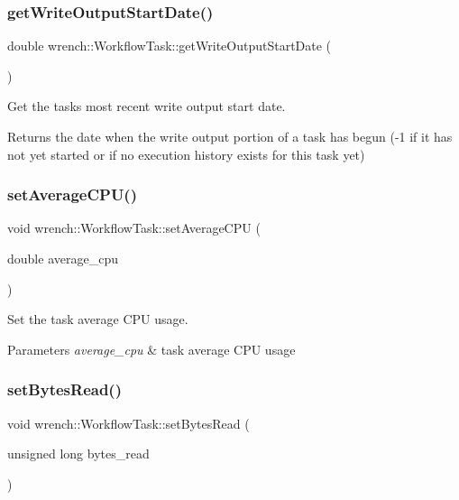 \subsubsection{\texorpdfstring{get\+Write\+Output\+Start\+Date()}{getWriteOutputStartDate()}}
{\footnotesize\ttfamily double wrench\+::\+Workflow\+Task\+::get\+Write\+Output\+Start\+Date (\begin{DoxyParamCaption}{ }\end{DoxyParamCaption})}



Get the task\textquotesingle{}s most recent write output start date. 

\begin{DoxyReturn}{Returns}
the date when the write output portion of a task has begun (-\/1 if it has not yet started or if no execution history exists for this task yet) 
\end{DoxyReturn}
\mbox{\label{classwrench_1_1_workflow_task_a8f4207c4fc2eea8f6370701a747a5238}} 
\subsubsection{\texorpdfstring{set\+Average\+C\+P\+U()}{setAverageCPU()}}
{\footnotesize\ttfamily void wrench\+::\+Workflow\+Task\+::set\+Average\+C\+PU (\begin{DoxyParamCaption}\item[{double}]{average\+\_\+cpu }\end{DoxyParamCaption})}



Set the task average C\+PU usage. 


\begin{DoxyParams}{Parameters}
{\em average\+\_\+cpu} & task average C\+PU usage \\
\hline
\end{DoxyParams}
\mbox{\label{classwrench_1_1_workflow_task_ab438ab4409f1ddcb423c90577a611fe6}} 
\subsubsection{\texorpdfstring{set\+Bytes\+Read()}{setBytesRead()}}
{\footnotesize\ttfamily void wrench\+::\+Workflow\+Task\+::set\+Bytes\+Read (\begin{DoxyParamCaption}\item[{unsigned long}]{bytes\+\_\+read }\end{DoxyParamCaption})}



